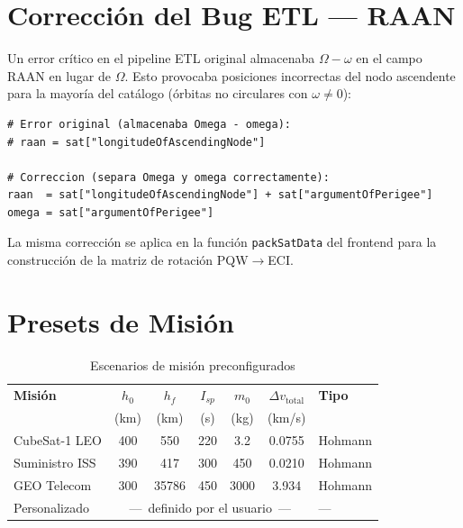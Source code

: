\documentclass[12pt,a4paper]{article}
\newcommand{\dvtot}{\Delta v_{\text{total}}}
\newcommand{\code}[1]{\texttt{\small #1}}
\begin{document}
\section{Correcci\'on del Bug ETL --- RAAN}

Un error cr\'itico en el pipeline ETL original almacenaba $\Omega - \omega$ en el campo RAAN en lugar de $\Omega$. Esto provocaba posiciones incorrectas del nodo ascendente para la mayor\'ia del cat\'alogo (\'orbitas no circulares con $\omega \neq 0$):

\begin{lstlisting}[style=pyStyle, caption={Correcci\'on del bug RAAN (scripts/load\_satellites.py)}]
# Error original (almacenaba Omega - omega):
# raan = sat["longitudeOfAscendingNode"]

# Correccion (separa Omega y omega correctamente):
raan  = sat["longitudeOfAscendingNode"] + sat["argumentOfPerigee"]
omega = sat["argumentOfPerigee"]
\end{lstlisting}

La misma correcci\'on se aplica en la funci\'on \code{packSatData} del frontend para la construcci\'on de la matriz de rotaci\'on PQW$\to$ECI.

\section{Presets de Misi\'on}

\begin{table}[H]
\centering
\caption{Escenarios de misi\'on preconfigurados}
\label{tab:presets}
\begin{tabular}{lcccccl}
\toprule
\textbf{Misi\'on} & $h_0$ & $h_f$ & $I_{sp}$ & $m_0$ & $\dvtot$ & \textbf{Tipo} \\
 & (km) & (km) & (s) & (kg) & (km/s) & \\
\midrule
CubeSat-1 LEO  & 400  & 550   & 220 & 3.2  & 0.0755 & Hohmann \\
Suministro ISS & 390  & 417   & 300 & 450  & 0.0210 & Hohmann \\
GEO Telecom    & 300  & 35786 & 450 & 3000 & 3.934  & Hohmann \\
Personalizado  & \multicolumn{5}{c}{---\ definido por el usuario\ ---} & --- \\
\bottomrule
\end{tabular}
\end{table}
\end{document}
